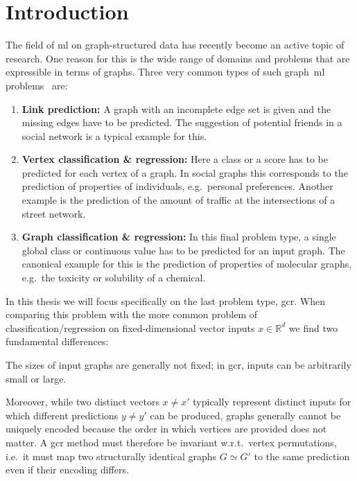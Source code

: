 \chapter{Introduction}%
\label{sec:intro}

\setcounter{page}{1}			%

The field of \ac{ml} on graph-structured data has recently become an active topic of research.
One reason for this is the wide range of domains and problems that are expressible in terms of graphs.
Three very common types of such graph~\ac{ml} problems~\cite{Wu2019} are:
\begin{enumerate}[label=\textbf{\arabic*.}]
	\item \textbf{Link prediction:}
		A graph with an incomplete edge set is given and the missing edges have to be predicted.
		The suggestion of potential friends in a social network is a typical example for this.
	\item \textbf{Vertex classification \& regression:}
		Here a class or a score has to be predicted for each vertex of a graph.
		In social graphs this corresponds to the prediction of properties of individuals, e.g.\ personal preferences.
		Another example is the prediction of the amount of traffic at the intersections of a street network.
	\item \textbf{Graph classification \& regression:}
		In this final problem type, a single global class or continuous value has to be predicted for an input graph.
		The canonical example for this is the prediction of properties of molecular graphs, e.g.\ the toxicity or solubility of a chemical.
\end{enumerate}
In this thesis we will focus specifically on the last problem type, \ac{gcr}.
When comparing this problem with the more common problem of classification/regression on fixed-dimensional vector inputs $x \in \mathbb{R}^d$ we find two fundamental differences:
\begin{enumerate*}[label={\circled{\small\arabic*}}]
	\item The sizes of input graphs are generally not fixed; in \ac{gcr}, inputs can be arbitrarily small or large.
	\item Moreover, while two distinct vectors $x \neq x'$ typically represent distinct inputs for which different predictions $y \neq y'$ can be produced, graphs generally cannot be uniquely encoded because the order in which vertices are provided does not matter.
		A \ac{gcr} method must therefore be invariant w.r.t.\ vertex permutations, i.e.\ it must map two structurally identical graphs $G \simeq G'$ to the same prediction even if their encoding differs.
\end{enumerate*}

